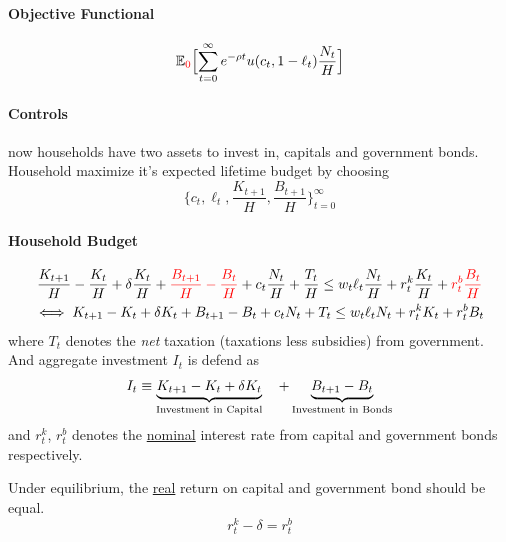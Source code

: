 \documentclass[11pt]{article}
\newcommand{\expat}[2]{\mathbb{E}_{#1}\Big[{#2}\Big]}
\begin{document}
				\paragraph{Objective Functional}
					\begin{equation}
						\expat{\textcolor{red}{0}}{
							\sum_{t=0}^\infty e^{-\rho t} u(c_t, 1 - \ell_t) \frac{N_t}{H}
							}
					\end{equation}
				\paragraph{Controls} now households have two assets to invest in, capitals and government bonds.\\
				Household maximize it's expected lifetime budget by choosing
					\begin{equation}
						\{c_t, \ell_t, \frac{K_{t+1}}{H}, \frac{B_{t+1}}{H}\}_{t=0}^\infty
					\end{equation}
				
				\paragraph{Household Budget}
					\begin{gather}
						\frac{K_{t+1}}{H} - \frac{K_t}{H} + \delta \frac{K_t}{H} + \textcolor{red}{\frac{B_{t+1}}{H} - \frac{B_t}{H}} + c_t \frac{N_t}{H} + \frac{T_t}{H} \leq w_t \ell_t \frac{N_t}{H} + r^k_t \frac{K_t}{H} + \textcolor{red}{r^b_t \frac{B_t}{H}}\\
						\iff K_{t+1} - K_t + \delta K_t + B_{t+1} - B_t + c_t N_t + T_t \leq w_t \ell_t N_t + r^k_t K_t + r^b_t B_t
					\end{gather}
					where $T_t$ denotes the \emph{net} taxation (taxations less subsidies) from government. \\
					And aggregate investment $I_t$ is defend as
					\begin{equation}
						I_t \equiv \underbrace{
							K_{t+1} - K_t + \delta K_t}_{\text{{Investment in Capital}}}\quad + \underbrace{B_{t+1} - B_t}_{\text{{Investment in Bonds}}}
					\end{equation}
					and $r^k_t$, $r^b_t$ denotes the \ul{nominal} interest rate from capital and government bonds respectively.
					\begin{remark}
						Under equilibrium, the \ul{real} return on capital and government bond should be equal.
						\begin{equation}
							r_t^k - \delta = r_t^b
						\end{equation}
					\end{remark}
				
\end{document}
